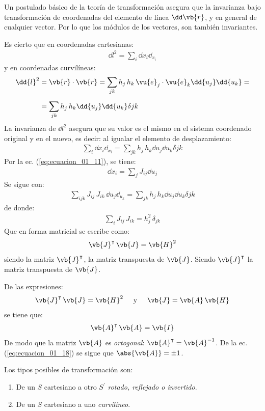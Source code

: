 Un postulado básico de la teoría de transformación asegura que la invarianza bajo transformación de coordenadas del elemento de línea $\dd\vb{r}$, y en general de cualquier vector. Por lo que los módulos de los vectores, son también invariantes.
\par
Es cierto que en coordenadas cartesianas:
\begin{align*}
\dd{l}^{2} = \sum_{i} \dd{x_{i}} \dd_{x_{i}}
\end{align*}
y en coordenadas curvilíneas:
\begin{align*}
\dd{l}^{2} &= \vb{r} \cdot \vb{r} = \sum_{jk} h_{j} \, h_{k} \, \vu{e}_{j} \cdot \vu{e}_{k} \dd{u_{j}} \dd{u_{k}} = \\[0.5em]
&= \sum_{jk} h_{j} \, h_{k} \dd{u_{j}} \dd{u_{k}} \delta{jk}
\end{align*}
La invarianza de $\dd{l}^{2}$ asegura que su valor es el mismo en el sistema coordenado original y en el nuevo, es decir: al igualar el elemento de desplazamiento:
\begin{align*}
\sum_{i} \dd{x_{i}} \dd_{x_{i}} = \sum_{jk} h_{j} \, h_{k} \dd{u_{j}} \dd{u_{k}} \delta{jk}
\end{align*}
Por la ec. (\ref{eq:ecuacion_01_11}), se tiene:
\begin{align*}
\dd{x_{i}} = \sum_{j} J_{ij} \dd{u_{j}}
\end{align*}
Se sigue con:
\begin{align*}
\sum_{ijk} J_{ij} \, J_{ik} \, \dd{u_{j}} \dd_{u_{k}} = \sum_{jk} h_{j} \, h_{k} \dd{u_{j}} \dd{u_{k}} \delta{jk}
\end{align*}
de donde:
\begin{align*}
\sum_{i} J_{ij} \, J_{ik} = h_{j}^{2} \, \delta_{jk}
\end{align*}
Que en forma matricial se escribe como:
\begin{align*}
\vb{J}^{\intercal} \, \vb{J} = \vb{H}^{2}
\end{align*}
siendo la matriz $\vb{J}^{\intercal}$, la matriz transpuesta de $\vb{J}$. Siendo $\vb{J}^{\intercal}$ la matriz transpuesta de $\vb{J}$.
\par
De las expresiones:
\begin{align*}
\vb{J}^{\intercal} \, \vb{J} = \vb{H}^{2} \hspace{0.5cm} \mbox{y} \hspace{0.5cm} \vb{J} = \vb{A} \, \vb{H}
\end{align*}
se tiene que:
\begin{align}
\vb{A}^{\intercal} \, \vb{A} = \vb{I}
\label{eq:ecuacion_01_18}
\end{align}
De modo que la matriz $\vb{A}$ es \emph{ortogonal}: $\vb{A}^{\intercal} = \vb{A}^{-1}$.
De la ec. (\ref{eq:ecuacion_01_18}) se sigue que $\abs{\vb{A}} = \pm 1$.
\par
Los tipos posibles de transformación son:
\begin{enumerate}
\item De un $S$ cartesiano a otro $S^{\prime}$ \emph{rotado, reflejado o invertido}.
\item De un $S$ cartesiano a uno \emph{curvilíneo}.
\end{enumerate}

